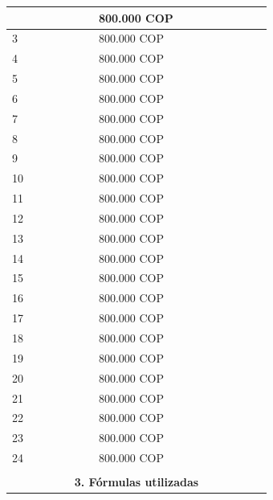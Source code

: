 \begin{center}
\begin{longtable}[H]{|p{0.333\linewidth}|p{0.3333\linewidth}|p{0.3333\linewidth}|}
{\begin{center}
\begin{tabular}{|p{4cm}|p{4cm}|}
    2                      &  800.000 COP    \\ \hline
    3                      &  800.000 COP    \\ \hline
    4                      &  800.000 COP    \\ \hline
    5                      &  800.000 COP    \\ \hline
    6                      &  800.000 COP    \\ \hline
    7                      &  800.000 COP    \\ \hline
    8                      &  800.000 COP    \\ \hline
    9                      &  800.000 COP    \\ \hline
    10                     &  800.000 COP    \\ \hline
    11                     &  800.000 COP    \\ \hline
    12                     &  800.000 COP    \\ \hline
    13                     &  800.000 COP    \\ \hline
    14                     &  800.000 COP    \\ \hline
    15                     &  800.000 COP    \\ \hline
    16                     &  800.000 COP    \\ \hline
    17                     &  800.000 COP    \\ \hline
    18                     &  800.000 COP    \\ \hline
    19                     &  800.000 COP    \\ \hline
    20                     &  800.000 COP    \\ \hline
    21                     &  800.000 COP    \\ \hline
    22                     &  800.000 COP    \\ \hline
    23                     &  800.000 COP    \\ \hline
    24                     &  800.000 COP    \\ \hline
   \end{tabular}
  \end{center}
  }                                                                                                                   \\ \hline
  \multicolumn{3}{|c|}{\cellcolor[HTML]{FFB183}\textbf{3. Fórmulas utilizadas}}                                       \\ \hline

\end{longtable}
\end{center}
